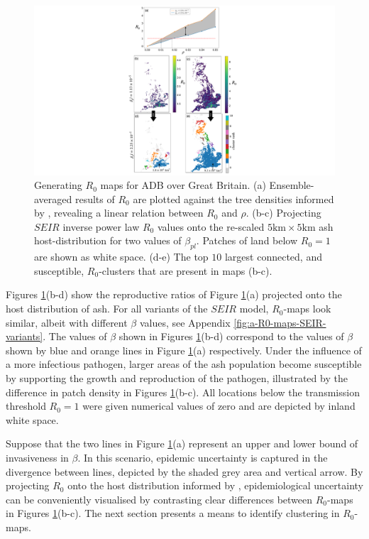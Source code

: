 \begin{figure}
    \centering
    \includegraphics[scale=0.55]{chapter6/figures/fig6-R0-map-generation.pdf}
    \caption{Generating $R_0$ maps for ADB over Great Britain. (a) Ensemble-averaged results of $R_0$ are plotted against the tree densities informed by \cite{hill.data}, revealing a linear relation between $R_0$ and $\rho$. (b-c) Projecting $SEIR$ inverse power law $R_0$ values onto the re-scaled $5\mathrm{km} \times 5 \mathrm{km}$ ash host-distribution for two values of $\beta_{pl}$. Patches of land below $R_0 = 1$ are shown as white space. (d-e) The top $10$ largest connected, and susceptible, $R_0$-clusters that are present in maps (b-c).}
    \label{fig:R0-map-generation}
\end{figure}

Figures \ref{fig:R0-map-generation}(b-d) show the reproductive ratios of Figure \ref{fig:R0-map-generation}(a) projected onto the host distribution of ash. 
For all variants of the $SEIR$ model, $R_0$-maps look similar, albeit with different $\beta$ values, see Appendix \ref{fig:a-R0-maps-SEIR-variants}. 
The values of $\beta$ shown in Figures \ref{fig:R0-map-generation}(b-d) correspond to the values of $\beta$ shown by blue and orange lines in Figure \ref{fig:R0-map-generation}(a) respectively. 
Under the influence of a more infectious pathogen, larger areas of the ash population become susceptible by supporting the growth and reproduction of the pathogen, illustrated by the difference in patch density in Figures \ref{fig:R0-map-generation}(b-c). 
All locations below the transmission threshold $R_0=1$ were given numerical values of zero and are depicted by inland white space.

Suppose that the two lines in Figure \ref{fig:R0-map-generation}(a) represent an upper and lower bound of invasiveness in $\beta$. 
In this scenario, epidemic uncertainty is captured in the divergence between lines, depicted by the shaded grey area and vertical arrow. 
By projecting $R_0$ onto the host distribution informed by \cite{hill.data}, epidemiological uncertainty can be conveniently visualised by contrasting clear differences between $R_0$-maps in Figures \ref{fig:R0-map-generation}(b-c). 
The next section presents a means to identify clustering in $R_0$-maps.

